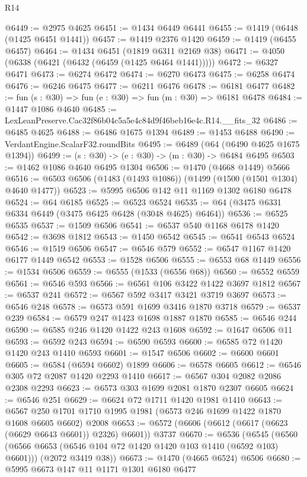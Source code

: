 \begin{lexlean}{R14}
\begin{coremodule}
@6449 := @2975 @4625
@6451 := @1434 @6449 @6441
@6455 := @1419 (@6448 (@1425 @6451 @1441))
@6457 := @1419 @2376 @1420
@6459 := @1419 (@6455 @6457)
@6464 := @1434 @6451 (@1819 @6311 @2169 @38)
@6471 := @4050 (@6338 (@6421 (@6432 (@6459 (@1425 @6464 @1441)))))
@6472 := @6327 @6471
@6473 := @6274 @6472
@6474 := @6270 @6473
@6475 := @6258 @6474
@6476 := @6246 @6475
@6477 := @6211 @6476
@6478 := @6181 @6477
@6482 := fun (s : @30) => fun (e : @30) => fun (m : @30) => @6181 @6478
@6484 := @1447 @1086 @4640
@6485 := LexLeanPreserve.Cac32f86b04c5a5e4c84d9f46beb16e4c.R14.__fits_32
@6486 := @6485 @4625
@6488 := @6486 @1675 @1394
@6489 := @1453 @6488
@6490 := VerdantEngine.ScalarF32.roundBits
@6495 := @6489 (@64 (@6490 @4625 @1675 @1394))
@6499 := (s : @30) -> (e : @30) -> (m : @30) -> @6484 @6495
@6503 := @1462 @1086 @4640 @6495 @1304
@6506 := @1470 (@4668 @1449) @5666
@6516 := @6503 @6506 (@1483 (@1493 @1086)) (@1499 (@1500 (@1501 @1304) @4640 @1477))
@6523 := @5995 @6506 @142 @11 @1169 @1302 @6180 @6478
@6524 := @64 @6185
@6525 := @6523 @6524
@6535 := @64 (@3475 @6331 @6334 @6449 (@3475 @6425 @6428 (@3048 @4625) @6464))
@6536 := @6525 @6535
@6537 := @1509 @6506
@6541 := @6537 @540 @1168 @6178 @1420
@6542 := @3698 @1812
@6543 := @1450 @6542
@6545 := @6541 @6543 @6524
@6546 := @1519 @6506
@6547 := @6546 @579
@6552 := @6547 @1167 @1420 @6177 @1449 @6542
@6553 := @1528 @6506
@6555 := @6553 @68 @1449
@6556 := @1534 @6506
@6559 := @6555 (@1533 (@6556 @68))
@6560 := @6552 @6559
@6561 := @6546 @593
@6566 := @6561 @106 @3422 @1422 @3697 @1812
@6567 := @6537 @241
@6572 := @6567 @592 @3417 @3421 @3719 @3697
@6573 := @6546 @248
@6578 := @6573 @591 @1699 @3416 @1870 @3718
@6579 := @6537 @239
@6584 := @6579 @247 @1423 @1698 @1887 @1870
@6585 := @6546 @244
@6590 := @6585 @246 @1420 @1422 @243 @1608
@6592 := @1647 @6506 @11
@6593 := @6592 @243
@6594 := @6590 @6593
@6600 := @6585 @72 @1420 @1420 @243 @1410 @6593
@6601 := @1547 @6506
@6602 := @6600 @6601
@6605 := @6584 (@6594 @6602) @1899
@6606 := @6578 @6605
@6612 := @6546 @305 @72 @2087 @1420 @2293 @1410
@6617 := @6567 @304 @2082 @2086 @2308 @2293
@6623 := @6573 @303 @1699 @2081 @1870 @2307 @6605
@6624 := @6546 @251
@6629 := @6624 @72 @1711 @1420 @1981 @1410
@6643 := @6567 @250 @1701 @1710 @1995 @1981 (@6573 @246 @1699 @1422 @1870 @1608 @6605 @6602) @2008
@6653 := @6572 (@6606 (@6612 (@6617 (@6623 (@6629 @6643 @6601)) @2326) @6601)) @3737
@6670 := @6536
    (@6545
      (@6560 (@6566 @6653 (@6546 @104 @72 @1420 @1420 @103 @1410 (@6592 @103) @6601)))
      (@2072 @3419 @38))
@6673 := @1470 (@4665 @6524) @6506
@6680 := @5995 @6673 @147 @11 @1171 @1301 @6180 @6477

\end{coremodule}
\end{lexlean}
